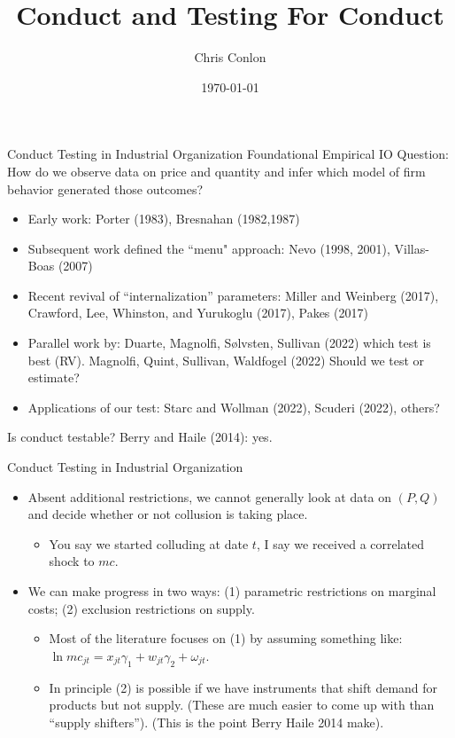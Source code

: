 \documentclass[aspectratio=169,10pt]{beamer}
\title{Conduct and Testing For Conduct}
\author{Chris Conlon}
\institute{Grad IO}
\date{\today}
\begin{document}
\frame{\titlepage}


\begin{frame}[plain]{Conduct Testing in Industrial Organization}
Foundational Empirical IO Question: How do we observe data on price and quantity and infer which model of firm behavior generated those outcomes?

\begin{itemize}
\item Early work: Porter (1983), Bresnahan (1982,1987)
\item Subsequent work defined the ``menu" approach: Nevo (1998, 2001), Villas-Boas (2007) 
\item Recent revival of ``internalization'' parameters: Miller and Weinberg (2017), Crawford, Lee, Whinston, and Yurukoglu (2017), Pakes (2017)
\item Parallel work by: Duarte, Magnolfi, Sølvsten, Sullivan (2022) which test is best (RV). Magnolfi, Quint, Sullivan, Waldfogel (2022) Should we test or estimate?
\item Applications of our test: Starc and Wollman (2022), Scuderi (2022), others?
\end{itemize}
Is conduct testable? Berry and Haile (2014): yes.
\end{frame}


\begin{frame}{Conduct Testing in Industrial Organization}
\begin{itemize}
\item Absent additional restrictions, we cannot generally look at data on $(P,Q)$ and decide whether or not collusion is taking place.
\begin{itemize}
\item You say we started colluding at date $t$, I say we received a correlated shock to $mc$.
\end{itemize}
\item We can make progress in two ways: (1) parametric restrictions on marginal costs; (2) exclusion restrictions on supply.
\begin{itemize}
\item Most of the literature focuses on (1) by assuming something like: $\ln mc_{jt} = x_{jt} \gamma_1 + w_{jt} \gamma_2 + \omega_{jt}$.
\item In principle (2) is possible if we have instruments that shift demand for products but not supply. (These are much easier to come up with than ``supply shifters''). (This is the point Berry Haile 2014 make).
\end{itemize}
\end{itemize}
\end{frame}
\end{document}
